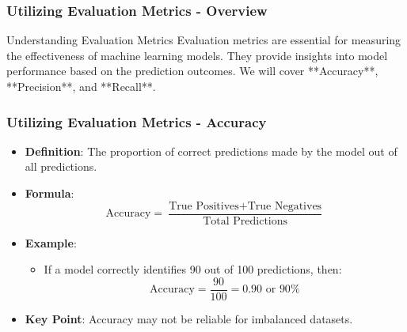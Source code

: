 \documentclass[aspectratio=169]{beamer}
\begin{document}
\begin{frame}[fragile]
  \frametitle{Utilizing Evaluation Metrics - Overview}
  \begin{block}{Understanding Evaluation Metrics}
    Evaluation metrics are essential for measuring the effectiveness of machine learning models. They provide insights into model performance based on the prediction outcomes. We will cover **Accuracy**, **Precision**, and **Recall**.
  \end{block}
\end{frame}

\begin{frame}[fragile]
  \frametitle{Utilizing Evaluation Metrics - Accuracy}
  \begin{itemize}
    \item \textbf{Definition}: The proportion of correct predictions made by the model out of all predictions.
    \item \textbf{Formula}:
      \begin{equation}
        \text{Accuracy} = \frac{\text{True Positives} + \text{True Negatives}}{\text{Total Predictions}} 
      \end{equation}
    \item \textbf{Example}: 
      \begin{itemize}
        \item If a model correctly identifies 90 out of 100 predictions, then:
        \begin{equation}
          \text{Accuracy} = \frac{90}{100} = 0.90 \text{ or } 90\%
        \end{equation}
      \end{itemize}
    \item \textbf{Key Point}: Accuracy may not be reliable for imbalanced datasets.
  \end{itemize}
\end{frame}
\end{document}
